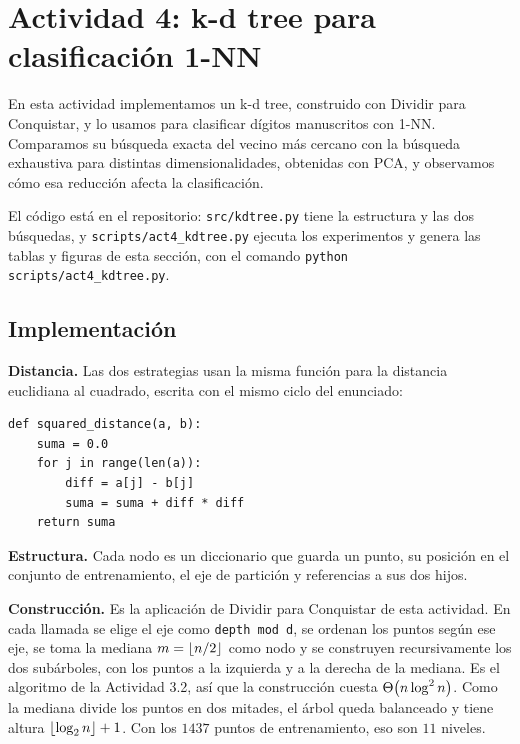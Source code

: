 \section{Actividad 4: k-d tree para clasificación 1-NN}
\label{sec:act4}


En esta actividad implementamos un k-d tree, construido con Dividir para Conquistar, y
lo usamos para clasificar dígitos manuscritos con 1-NN. Comparamos su búsqueda exacta del
vecino más cercano con la búsqueda exhaustiva para distintas dimensionalidades,
obtenidas con PCA, y observamos cómo esa reducción afecta la clasificación.

El código está en el repositorio: \texttt{src/kdtree.py} tiene la estructura y las dos
búsquedas, y \texttt{scripts/act4\_kdtree.py} ejecuta los experimentos y genera las
tablas y figuras de esta sección, con el comando \texttt{python scripts/act4\_kdtree.py}.

\subsection{Implementación}

\textbf{Distancia.} Las dos estrategias usan la misma función para la distancia euclidiana
al cuadrado, escrita con el mismo ciclo del enunciado:
\begin{lstlisting}
def squared_distance(a, b):
    suma = 0.0
    for j in range(len(a)):
        diff = a[j] - b[j]
        suma = suma + diff * diff
    return suma
\end{lstlisting}

\textbf{Estructura.} Cada nodo es un diccionario que guarda un punto, su posición en el
conjunto de entrenamiento, el eje de partición y referencias a sus dos hijos.

\textbf{Construcción.} Es la aplicación de Dividir para Conquistar de esta actividad. En
cada llamada se elige el eje como \texttt{depth mod d}, se ordenan los puntos según ese
eje, se toma la mediana $m = \lfloor n/2\rfloor$ como nodo y se construyen recursivamente los dos
subárboles, con los puntos a la izquierda y a la derecha de la mediana. Es el algoritmo de
la Actividad 3.2, así que la construcción cuesta $\Theta\!\left(n\log^2 n\right)$. Como la mediana divide
los puntos en dos mitades, el árbol queda balanceado y tiene altura
$\lfloor\log_2 n\rfloor + 1$. Con los $1437$ puntos de entrenamiento, eso son $11$ niveles.

